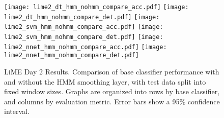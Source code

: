 \begin{figure}[H]
 \centering
 \texttt{[image: lime2\_dt\_hmm\_nohmm\_compare\_acc.pdf]} \hspace{1em}\vspace{1em}
 \texttt{[image: lime2\_dt\_hmm\_nohmm\_compare\_det.pdf]} 
 \texttt{[image: lime2\_svm\_hmm\_nohmm\_compare\_acc.pdf]} \hspace{1em}\vspace{1em}
 \texttt{[image: lime2\_svm\_hmm\_nohmm\_compare\_det.pdf]}
 \texttt{[image: lime2\_nnet\_hmm\_nohmm\_compare\_acc.pdf]} \hspace{1em}
 \texttt{[image: lime2\_nnet\_hmm\_nohmm\_compare\_det.pdf]}
 \caption{LiME Day 2 Results. Comparison of base classifier performance with and without the HMM
  smoothing layer, with test data split into fixed window sizes. Graphs are organized into rows by base
  classifier, and columns by evaluation metric. Error bars show a 95\% confidence interval.}
 \label{fig:lime2_hmm}
\end{figure}



